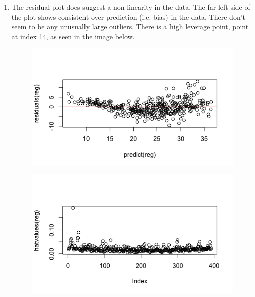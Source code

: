 \begin{enumerate}
	\item The residual plot does suggest a non-linearity in the data. The far left side of the plot shows consistent over prediction (i.e. bias) in the data. There don't seem to be any unusually large outliers. There is a high leverage point, point at index 14, as seen in the image below. 
	\begin{figure}[htbp]
		\centering
		\includegraphics{img/ESL_02_nonlinearity.png}
	\end{figure}
	\begin{figure}[htbp]
		\centering
		\includegraphics{img/ESL_02_leverage.png}
	\end{figure}
	
	
\end{enumerate}  


